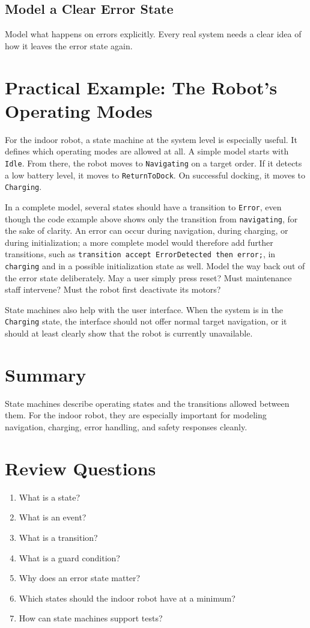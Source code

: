 \subsection{Model a Clear Error State}
Model what happens on errors explicitly. Every real system needs a clear idea of how it leaves the error state again.

\section{Practical Example: The Robot's Operating Modes}
For the indoor robot, a state machine at the system level is especially useful. It defines which operating modes are allowed at all. A simple model starts with \texttt{Idle}. From there, the robot moves to \texttt{Navigating} on a target order. If it detects a low battery level, it moves to \texttt{ReturnToDock}. On successful docking, it moves to \texttt{Charging}.

In a complete model, several states should have a transition to \texttt{Error}, even though the code example above shows only the transition from \texttt{navigating}, for the sake of clarity. An error can occur during navigation, during charging, or during initialization; a more complete model would therefore add further transitions, such as \texttt{transition accept ErrorDetected then error;}, in \texttt{charging} and in a possible initialization state as well. Model the way back out of the error state deliberately. May a user simply press reset? Must maintenance staff intervene? Must the robot first deactivate its motors?

State machines also help with the user interface. When the system is in the \texttt{Charging} state, the interface should not offer normal target navigation, or it should at least clearly show that the robot is currently unavailable.

\section{Summary}
State machines describe operating states and the transitions allowed between them. For the indoor robot, they are especially important for modeling navigation, charging, error handling, and safety responses cleanly.

\section{Review Questions}
\begin{enumerate}
    \item What is a state?
    \item What is an event?
    \item What is a transition?
    \item What is a guard condition?
    \item Why does an error state matter?
    \item Which states should the indoor robot have at a minimum?
    \item How can state machines support tests?
\end{enumerate}

